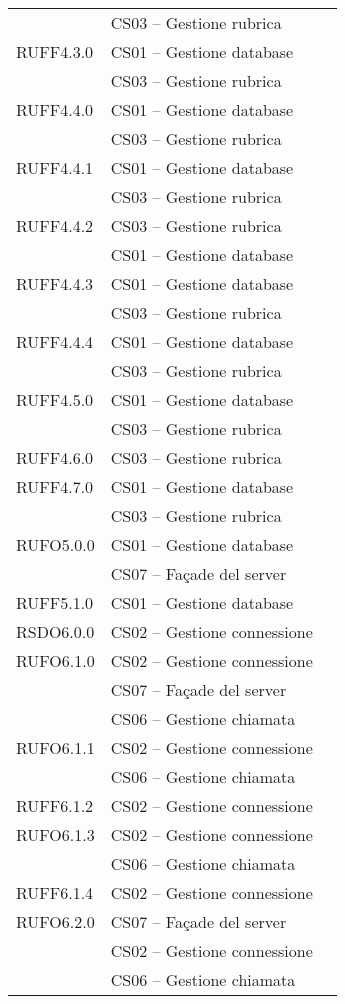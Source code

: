 \begin{center}
\begin{longtable}{lp{}l}
 & CS03 -- Gestione rubrica \\
RUFF4.3.0 & CS01 -- Gestione database \\
 & CS03 -- Gestione rubrica \\
RUFF4.4.0 & CS01 -- Gestione database \\
 & CS03 -- Gestione rubrica \\
RUFF4.4.1 & CS01 -- Gestione database \\
 & CS03 -- Gestione rubrica \\
RUFF4.4.2 & CS03 -- Gestione rubrica \\
 & CS01 -- Gestione database \\
RUFF4.4.3 & CS01 -- Gestione database \\
 & CS03 -- Gestione rubrica \\
RUFF4.4.4 & CS01 -- Gestione database \\
 & CS03 -- Gestione rubrica \\
RUFF4.5.0 & CS01 -- Gestione database \\
 & CS03 -- Gestione rubrica \\
RUFF4.6.0 & CS03 -- Gestione rubrica \\
RUFF4.7.0 & CS01 -- Gestione database \\
 & CS03 -- Gestione rubrica \\
RUFO5.0.0 & CS01 -- Gestione database \\
 & CS07 -- Façade del server \\
RUFF5.1.0 & CS01 -- Gestione database \\
RSDO6.0.0 & CS02 -- Gestione connessione \\
RUFO6.1.0 & CS02 -- Gestione connessione \\
 & CS07 -- Façade del server \\
  & CS06 -- Gestione chiamata \\
RUFO6.1.1 & CS02 -- Gestione connessione \\
  & CS06 -- Gestione chiamata \\
RUFF6.1.2 & CS02 -- Gestione connessione \\
RUFO6.1.3 & CS02 -- Gestione connessione \\
  & CS06 -- Gestione chiamata \\
RUFF6.1.4 & CS02 -- Gestione connessione \\
RUFO6.2.0 & CS07 -- Façade del server \\
 & CS02 -- Gestione connessione \\
   & CS06 -- Gestione chiamata \\

\end{longtable}
\end{center}
